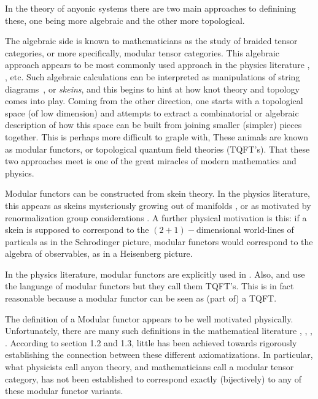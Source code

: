 \documentclass[aps, prl, letterpaper, twocolumn, superscriptaddress, notitlepage, 10pt]{revtex4-1}
\begin{document}
%
%

In the theory of anyonic systems 
there are two main approaches to definining these,
one being more algebraic and the other more topological.

The algebraic side is known to mathematicians as the study of braided
tensor categories, or more specifically, modular tensor categories.
This algebraic approach appears to be most commonly used 
approach in the physics literature \cite{Kitaev2006}, \cite{Pfeifer2012}, etc.
Such algebraic calculations can be interpreted as
manipulations of string diagrams~\cite{Baez2010},
or \emph{skeins},
and this begins to hint at
how knot theory and topology comes into play.
Coming from the other direction, one starts with
a topological space (of low dimension) and attempts
to extract a combinatorial or algebraic description of how this
space can be built from joining smaller (simpler) pieces together.
This is perhaps more difficult to graple with, 
These animals are known as modular functors, 
or topological quantum field theories (TQFT's).
That these two approaches meet is one of the great
miracles of modern mathematics and physics.


Modular functors can be constructed from skein theory.
In the physics literature, 
this appears as skeins mysteriously
growing out of manifolds \cite{Pfeifer2012},
or as motivated by renormalization group considerations \cite{Levin2005}.
A further physical motivation is this: if a skein 
is supposed to correspond to the $(2+1)-$dimensional
world-lines of particals
as in the Schrodinger picture,
modular functors would
correspond to the algebra of observables, as in
a Heisenberg picture.

In the physics literature, modular functors are
explicitly used in \cite{Freedman2002, Freedman2002simulation}.
Also, \cite{Beverland2014} and \cite{Kitaev2006topo}
use the language of modular functors but they call them TQFT's.
This is in fact reasonable because a modular functor can be
seen as (part of) a TQFT.

The definition of a Modular functor appears to
be well motivated physically.
Unfortunately, there are many such definitions
in the mathematical literature 
\cite{Walker1991}, \cite{Turaev1994}, \cite{Bakalov2001}, \cite{Tillmann1998}.
According to
\cite{Bartlett2015} section 1.2 and 1.3,
little has been achieved 
towards rigorously establishing the connection between these different axiomatizations.
In particular, what physicists call anyon theory,
and mathematicians call a modular tensor category,
has not been established to correspond exactly
(bijectively) to any of these modular functor
variants.
\end{document}
